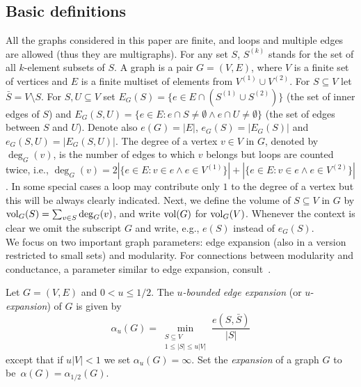 \documentclass[runningheads, envcountsame, smallextended]{llncs}
\newcommand{\vol}{{\rm vol}}
\numberwithin{theorem}{section}
\numberwithin{definition}{section}
\numberwithin{lemma}{section}
\numberwithin{corollary}{section}
\numberwithin{proposition}{section}
\numberwithin{conjecture}{section}
\numberwithin{remark}{section}
\numberwithin{equation}{section}
\begin{document}
\subsection{Basic definitions}

All the graphs considered in this paper are finite, and loops and multiple edges are allowed (thus they are multigraphs). For any set $S$, $S^{(k)}$ stands for the set of all $k$-element subsets of $S$. A graph is a pair $G=(V,E)$, where $V$ is a finite set of vertices and $E$ is a finite multiset of elements from $V^{(1)} \cup V^{(2)}$. For $S \subseteq V$ let $\bar{S} = V \setminus S$.  For $S,U \subseteq V$ set $E_G(S) = \{e \in E \cap (S^{(1)} \cup S^{(2)})\}$ (the set of inner edges of $S$) and $E_G(S,U) = \{e \in E: e \cap S \neq \emptyset \wedge e \cap U \neq \emptyset\}$ (the set of edges between $S$ and $U$). Denote also $e(G) = |E|$, $e_G(S) = |E_G(S)|$ and $e_G(S,U) = |E_G(S,U)|$. The degree of a vertex $v \in V$ in $G$, denoted by $\deg_G(v)$, is the number of edges to which $v$ belongs but loops are counted twice, i.e., $\deg_G(v) = 2 |\{e \in E: v \in e \wedge e \in V^{(1)}\}| + |\{e \in E: v \in e \wedge e \in  V^{(2)}\}|$. In some special cases a loop may contribute only $1$ to the degree of a vertex but this will be always clearly indicated. Next, we define the volume of $S \subseteq V$ in $G$ by $\vol_G(S) = \sum_{v \in S} \deg_G(v)$, and write $\vol(G)$ for $\vol_G(V)$. Whenever the context is clear we omit the subscript $G$ and write, e.g., $e(S)$ instead of $e_G(S)$.\\ 





We focus on two important graph parameters: edge expansion (also in a version restricted to small sets) and modularity. For connections between modularity and conductance, a parameter similar to edge expansion, consult~\cite{modexpansion}.



\begin{definition} \label{def:uexpansion} Let $G=(V,E)$ and $0 < u \leq 1/2$. The \emph{$u$-bounded edge expansion} (or $u$-\emph{expansion}) of $G$ is given by
	\[
	\alpha_u(G) = \min_{\substack{S \subseteq V \\ 1 \leq |S| \leq u|V|}} \frac{e(S,\bar{S})}{|S|}
	\]
	except that if $u|V|<1$ we set $\alpha_u(G)=\infty$. 
	Set the \emph{expansion} of a graph $G$ to be~$\alpha(G)=\alpha_{1/2}(G)$.
\end{definition}
\end{document}

